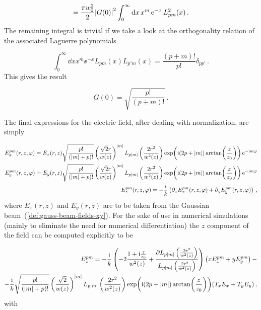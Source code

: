 \documentclass[12pt, class=report, crop=false]{standalone}
\begin{document}
\begin{equation*}
  = \frac{\pi w_0^2}{2} \abs{G(0)}^2 \int_0^\infty \dd{x} x^m \operatorname{e}^{-x} L_{pm}^2 (x)\,.
\end{equation*}
The remaining integral is trivial if we take a look at the orthogonality relation of the associated Laguerre polynomials

\begin{equation}
  \int_0^\infty \dd{x} x^m \ee^{-x} L_{pm}(x) L_{p'm}(x) = \frac{(p+m)!}{p!} \delta_{pp'}\,.
\end{equation}
This gives the result

\begin{equation}
  G(0) = \sqrt{\frac{p!}{(p+m)!}}\,.
\end{equation}

The final expressions for the electric field, after dealing with normalization, are simply

\begin{subequations}
  \begin{align}
    E_x^{pm} (r,z,\varphi) = E_x(r,z) \sqrt{\frac{p!}{(\abs{m}+p)!}} \left(\frac{\sqrt{2}r}{w(z)}\right)^{\abs{m}} L_{p\abs{m}} \left(\frac{2r^2}{w^2(z)}\right) \exp(\mathrm{i} (2p+\abs{m}) \arctan(\frac{z}{z_0}))\operatorname{e}^{-\mathrm{i} m \varphi} \\
    E_y^{pm} (r,z,\varphi) = E_y(r,z) \sqrt{\frac{p!}{(\abs{m}+p)!}} \left(\frac{\sqrt{2}r}{w(z)}\right)^{\abs{m}} L_{p\abs{m}} \left(\frac{2r^2}{w^2(z)}\right) \exp(\mathrm{i} (2p+\abs{m}) \arctan(\frac{z}{z_0}))\operatorname{e}^{-\mathrm{i} m \varphi} \\
    E_z^{pm} (r,z,\varphi) = - \frac{i}{k} \left(\partial_x E_x^{pm} (r,z,\varphi) + \partial_y E_y^{pm} (r,z,\varphi) \right) \,,
  \end{align}
\end{subequations}
where \(E_x(r,z)\) and \(E_y(r,z)\) are to be taken from the Gaussian beam~(\ref{def:gauss-beam-fields-xy}). For the sake of use in numerical simulations (mainly to eliminate the need for numerical differentiation) the \(z\) component of the field can be computed explicitly to be

\begin{equation}
  \begin{aligned}
    E_z^{pm} = - \frac{\mathrm{i}}{k} \left(-2\frac{1+\mathrm{i}\frac{z}{z_0}}{w^2(z)} +\frac{\partial L_{p\abs{m}}\left(\frac{2r^2}{w^2(z)}\right)}{L_{p\abs{m}}\left(\frac{2r^2}{w^2(z)}\right)}\right) \left( xE_x^{pm} + yE_y^{pm} \right) - \\
    -\frac{\mathrm{i}}{k}\sqrt{\frac{p!}{(\abs{m}+p)!}} \left(\frac{\sqrt{2}}{w(z)}\right)^{\abs{m}} L_{p\abs{m}} \left(\frac{2r^2}{w^2(z)}\right) \exp(\mathrm{i} (2p+\abs{m}) \arctan(\frac{z}{z_0})) (T_x E_x + T_y E_y)\,,
  \end{aligned}
\end{equation}
with
\end{document}
